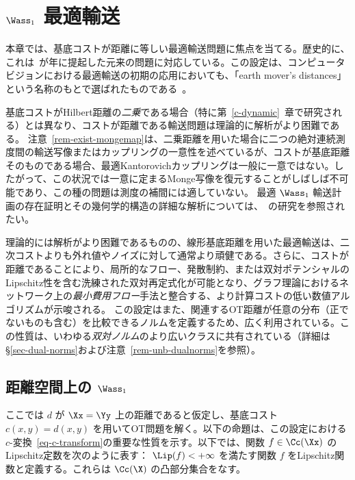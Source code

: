 

\chapter{$\Wass_1$ 最適輸送}
\label{c-w1}

本章では、基底コストが距離に等しい最適輸送問題に焦点を当てる。歴史的に、これは~\citeauthor{Monge1781}が\citeyear{Monge1781}年に提起した元来の問題に対応している。この設定は、コンピュータビジョンにおける最適輸送の初期の応用においても、「earth mover's distances」という名称のもとで選ばれたものである~\citep{RubTomGui00}。

基底コストがHilbert距離の\emph{二乗}である場合（特に第~\ref{c-dynamic}~章で研究される）とは異なり、コストが距離である輸送問題は理論的に解析がより困難である。
%
注意~\ref{rem-exist-mongemap}は、二乗距離を用いた場合に二つの絶対連続測度間の輸送写像またはカップリングの一意性を述べているが、コストが基底距離そのものである場合、最適Kantorovichカップリングは一般に一意ではない。したがって、この状況では一意に定まるMonge写像を復元することがしばしば不可能であり、この種の問題は測度の補間には適していない。
%
最適 $\Wass_1$ 輸送計画の存在証明とその幾何学的構造の詳細な解析については、~\citet{trudinger2001monge,caffarelli2002constructing,sudakov1979geometric,evans1999differential}の研究を参照されたい。

理論的には解析がより困難であるものの、線形基底距離を用いた最適輸送は、二次コストよりも外れ値やノイズに対して通常より頑健である。さらに、コストが距離であることにより、局所的なフロー、発散制約、または双対ポテンシャルのLipschitz性を含む洗練された双対再定式化が可能となり、グラフ理論におけるネットワーク上の\emph{最小費用フロー}手法と整合する、より計算コストの低い数値アルゴリズムが示唆される。
%
この設定はまた、関連するOT距離が任意の分布（正でないものも含む）を比較できるノルムを定義するため、広く利用されている。この性質は、いわゆる\emph{双対ノルム}のより広いクラスに共有されている（詳細は\S\ref{sec-dual-norms}および注意~\ref{rem-unb-dualnorms}を参照）。

\section{距離空間上の $\Wass_1$}
\label{sec-w1-metric}

ここでは $d$ が $\Xx=\Yy$ 上の距離であると仮定し、基底コスト $c(x,y)=d(x,y)$ を用いてOT問題を解く。以下の命題は、この設定における $c$-変換~\eqref{eq-c-transform}の重要な性質を示す。以下では、関数 $f \in \Cc(\Xx)$ のLipschitz定数を次のように表す：
$\Lip(f) < +\infty$ を満たす関数 $f$ をLipschitz関数と定義する。これらは $\Cc(\X)$ の凸部分集合をなす。

